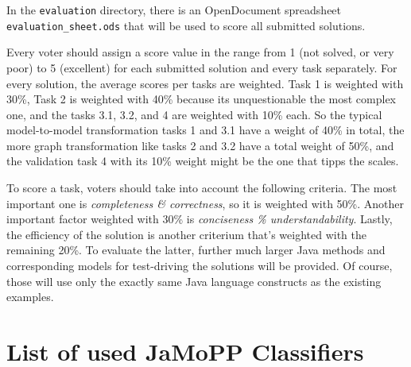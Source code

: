 \documentclass[10pt]{article}
\begin{document}
In the \verb|evaluation| directory, there is an OpenDocument spreadsheet
\verb|evaluation_sheet.ods| that will be used to score all submitted solutions.

Every voter should assign a score value in the range from 1 (not solved, or
very poor) to 5 (excellent) for each submitted solution and every task
separately.  For every solution, the average scores per tasks are weighted.
Task 1 is weighted with 30\%, Task 2 is weighted with 40\% because its
unquestionable the most complex one, and the tasks 3.1, 3.2, and 4 are weighted
with 10\% each.  So the typical model-to-model transformation tasks 1 and 3.1
have a weight of 40\% in total, the more graph transformation like tasks 2 and
3.2 have a total weight of 50\%, and the validation task 4 with its 10\% weight
might be the one that tipps the scales.

To score a task, voters should take into account the following criteria.  The
most important one is \emph{completeness \& correctness}, so it is weighted
with 50\%.  Another important factor weighted with 30\% is \emph{conciseness \%
  understandability}.  Lastly, the efficiency of the solution is another
criterium that's weighted with the remaining 20\%.  To evaluate the latter,
further much larger Java methods and corresponding models for test-driving the
solutions will be provided.  Of course, those will use only the exactly same
Java language constructs as the existing examples.






\appendix

\section{List of used JaMoPP Classifiers}
\label{sec:list-used-jamopp}
\end{document}
